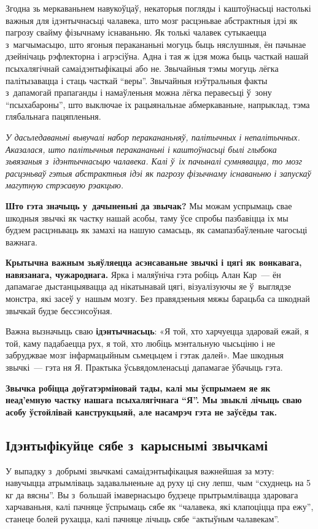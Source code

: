 Згодна зь меркаваньнем навукоўцаў, некаторыя погляды і каштоўнасьці настолькі важныя для ідэнтычнасьці чалавека, што мозг расцэньвае абстрактныя ідэі як пагрозу свайму фізычнаму існаваньню. Як толькі чалавек сутыкаецца з~магчымасьцю, што ягоныя перакананьні могуць быць няслушныя, ён пачынае дзейнічаць рэфлекторна і агрэсіўна. Адна і тая ж ідэя можа быць часткай нашай псыхалягічнай самаідэнтыфікацыі або не. Звычайныя тэмы могуць лёгка палітызавацца і стаць часткай ``веры''. Звычайныя нэўтральныя факты з~дапамогай прапаганды і намаўленьня можна лёгка перавесьці ў~зону ``псыхабароны'', што выключае іх рацыянальнае абмеркаваньне, напрыклад, тэма глябальнага пацяпленьня.

\emph{У дасьледаваньні вывучалі набор перакананьняў, палітычных і непалітычных. Аказалася, што палітычныя перакананьні і каштоўнасьці былі глыбока зьвязаныя з~ідэнтычнасьцю чалавека. Калі ў~іх пачыналі сумнявацца, то мозг расцэньваў гэтыя абстрактныя ідэі як пагрозу фізычнаму існаваньню і запускаў магутную стрэсавую рэакцыю.}

\textbf{Што гэта значыць у~дачыненьні да звычак?} Мы можам успрымаць свае шкодныя звычкі як частку нашай асобы, таму ўсе спробы пазбавіцца іх мы будзем расцэньваць як замахі на нашую самасьць, як самапазбаўленьне чагосьці важнага. 

\textbf{Крытычна важным зьяўляецца асэнсаваньне звычкі і цягі як вонкавага, навязанага, чужароднага.} Ярка і маляўніча гэта робіць Алан Кар~--- ён дапамагае дыстанцыявацца ад нікатынавай цягі, візуалізуючы яе ў~выглядзе монстра, які засеў у~нашым мозгу. Без правядзеньня мяжы барацьба са шкоднай звычкай будзе бессэнсоўная.

Важна вызначыць сваю \textbf{ідэнтычнасьць}: «Я той, хто харчуецца здаровай ежай, я той, каму падабаецца рух, я той, хто любіць мэнтальную чысьціню і не забруджвае мозг інфармацыйным сьмецьцем і гэтак далей». Мае шкодныя звычкі~--- гэта ня Я. Практыка ўсьвядомленасьці дапамагае ўбачыць гэта.

\textbf{Звычка робіцца доўгатэрміновай тады, калі мы ўспрымаем яе як неад'емную частку нашага псыхалягічнага ``Я''. Мы звыклі лічыць сваю асобу ўстойлівай канструкцыяй, але насамрэч гэта не заўсёды так.} 

\subsection*{Ідэнтыфікуйце сябе з~карыснымі звычкамі}

У выпадку з~добрымі звычкамі самаідэнтыфікацыя важнейшая за мэту: навучыцца атрымліваць задавальненьне ад руху ці сну лепш, чым ``схуднець на 5 кг да вясны''. Вы з~большай імавернасьцю будзеце прытрымлівацца здаровага харчаваньня, калі пачняце ўспрымаць сябе як ``чалавека, які клапоціцца пра ежу'', станеце болей рухацца, калі пачняце лічыць сябе ``актыўным чалавекам''.

